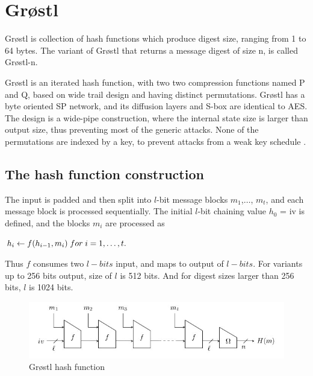 \newpage

\section{Gr{\o}stl}

Gr{\o}stl is collection of hash functions which produce digest size, ranging from 1 to 64 bytes. The variant of
Gr{\o}stl that returns a message digest of size n, is called Gr{\o}stl-n.

Gr{\o}stl is an iterated hash function, with two two compression functions named P and Q, based on wide trail design
and having distinct permutations. Gr{\o}stl has a byte oriented SP network, and its diffusion layers and S-box 
are identical to AES. The design is a wide-pipe construction, where the internal state size is larger than output 
size, thus preventing most of the generic attacks. None of the permutations are indexed by a key, to prevent attacks
from a weak key schedule \cite{00019}.

  \subsection{The hash function construction}

  The input is padded and then split into $l$-bit message blocks $m_{1}$,$\ldots$, $m_{t}$, and each message block is
  processed sequentially. The initial $l$-bit chaining value $h_{0}$ = iv is defined, and the blocks $m_{i}$ are
  processed as 
  \begin{center}$ h_{i}\gets f(h_{i-1}, m_{i})\thickspace for \thickspace i = 1,\ldots, t.$\end{center}
  Thus $f$ consumes two $l-bits$ input, and maps to output of $l-bits$. For variants up to 256 bits output, size of $l$ is
  512 bits. And for digest sizes larger than 256 bits, $l$ is 1024 bits.

  \begin{figure}[h]
    \begin{center}
      \includegraphics[width=5.5in]{groestlhashfunction.jpg}
    \end{center}
    \caption{Gr{\o}stl hash function \cite{00019}}
    \label{fig:lab}
  \end{figure}

